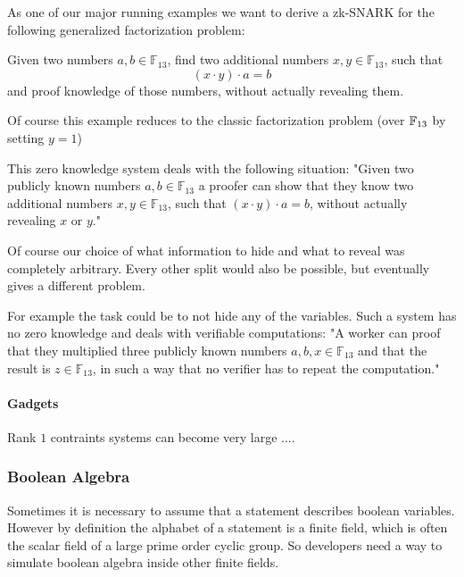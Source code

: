\begin{example}
\label{main_example_2_1}
As one of our major running examples we want to derive a zk-SNARK for the following generalized factorization problem: 

Given two numbers $a,b\in \mathbb{F}_{13}$, find two additional numbers $x,y\in \mathbb{F}_{13}$, such that
$$
(x\cdot y) \cdot a = b 
$$
and proof knowledge of those numbers, without actually revealing them.

Of course this example reduces to the classic factorization problem (over $\mathbb{F}_{13}$ by setting $y=1$)

This zero knowledge system deals with the following situation: "Given two publicly known numbers $a,b \in \mathbb{F}_{13}$ a proofer can show that they know two additional numbers $x,y\in \mathbb{F}_{13}$, such that $(x\cdot y) \cdot a = b$, without actually revealing $x$ or $y$." 

Of course our choice of what information to hide and what to reveal was completely arbitrary. Every other split would also be possible, but eventually gives a different problem. 

For example the task could be to not hide any of the variables.  Such 
a system has no zero knowledge and deals with verifiable computations: "A worker can proof that they multiplied three publicly known numbers $a,b,x \in \mathbb{F}_{13}$ and that the result is $z \in \mathbb{F}_{13}$, in such a way that no verifier has to repeat the computation."
\end{example}

\paragraph{Gadgets}
Rank $1$ contraints systems can become very large ....

\subsubsection{Boolean Algebra} 

Sometimes it is necessary to assume that a statement describes boolean variables. However by definition the alphabet of a statement is a finite field, which is often the scalar field of a large prime order cyclic group. So developers need a way to simulate boolean algebra inside other finite fields.

